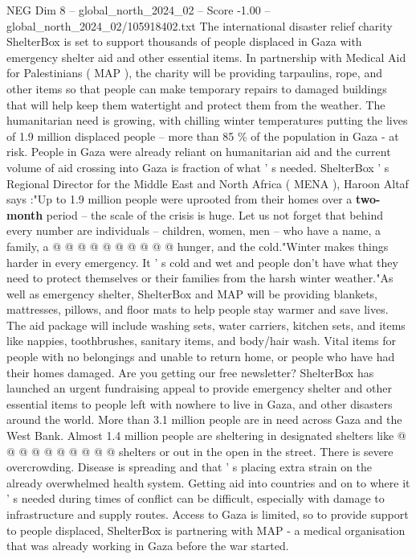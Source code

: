 \begin{textsample}{NEG Dim 8 – global\_north\_2024\_02 – Score -1.00 – global\_north\_2024\_02/105918402.txt}  \label{ex:f8_neg_438}
The international disaster relief charity ShelterBox is set to support thousands of people displaced in Gaza with emergency shelter aid and other essential items.
In partnership with Medical Aid for Palestinians ( MAP ), the charity will be providing tarpaulins, rope, and other items so that people can make temporary repairs to damaged buildings that will help keep them watertight and protect them from the weather.
The humanitarian need is growing, with chilling winter temperatures putting the lives of 1.9 million displaced people -- more than 85 \% of the population in Gaza - at risk.
People in Gaza were already reliant on humanitarian aid and the current volume of aid crossing into Gaza is fraction of what ' s needed.
ShelterBox ' s Regional Director for the Middle East and North Africa ( MENA ), Haroon Altaf says :"Up to 1.9 million people were uprooted from their homes over a \textbf{two-month} period -- the scale of the crisis is huge.
Let us not forget that behind every number are individuals -- children, women, men -- who have a name, a family, a @ @ @ @ @ @ @ @ @ @ hunger, and the cold."Winter makes things harder in every emergency.
It ' s cold and wet and people don't have what they need to protect themselves or their families from the harsh winter weather."As well as emergency shelter, ShelterBox and MAP will be providing blankets, mattresses, pillows, and floor mats to help people stay warmer and save lives.
The aid package will include washing sets, water carriers, kitchen sets, and items like nappies, toothbrushes, sanitary items, and body/hair wash.
Vital items for people with no belongings and unable to return home, or people who have had their homes damaged.
Are you getting our free newsletter?
ShelterBox has launched an urgent fundraising appeal to provide emergency shelter and other essential items to people left with nowhere to live in Gaza, and other disasters around the world.
More than 3.1 million people are in need across Gaza and the West Bank.
Almost 1.4 million people are sheltering in designated shelters like @ @ @ @ @ @ @ @ @ @ shelters or out in the open in the street.
There is severe overcrowding.
Disease is spreading and that ' s placing extra strain on the already overwhelmed health system.
Getting aid into countries and on to where it ' s needed during times of conflict can be difficult, especially with damage to infrastructure and supply routes.
Access to Gaza is limited, so to provide support to people displaced, ShelterBox is partnering with MAP - a medical organisation that was already working in Gaza before the war started.

\end{textsample}
